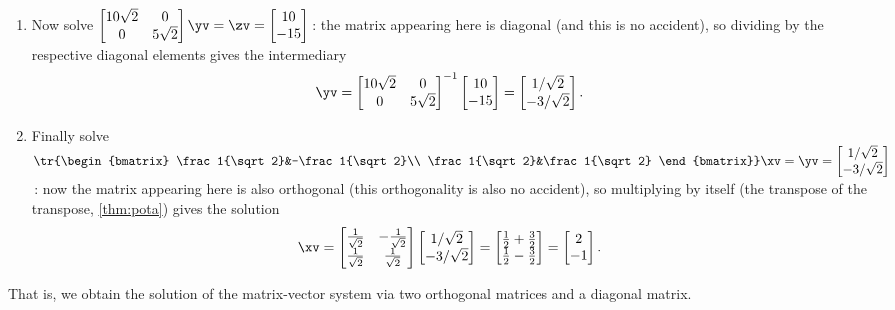 \begin{example}
\begin{solution}
\begin{enumerate}
\item Now solve \(\begin{bmatrix} 10\sqrt2&0\\0&5\sqrt2 \end{bmatrix}\yv=\zv=\begin{bmatrix} 10\\-15 \end{bmatrix}\)\,:  the matrix appearing here is diagonal (and this is no accident), so dividing by the respective diagonal elements gives the intermediary
\begin{equation*}
\yv=\begin{bmatrix} 10\sqrt2&0\\0&5\sqrt2 \end{bmatrix}^{-1}
\begin{bmatrix} 10\\-15 \end{bmatrix}
=\begin{bmatrix} 1/\sqrt2\\-3/\sqrt2 \end{bmatrix}.
\end{equation*}

\item Finally solve \(\tr{\begin{bmatrix} \frac1{\sqrt2}&-\frac1{\sqrt2}\\ \frac1{\sqrt2}&\frac1{\sqrt2} \end{bmatrix}}\xv=\yv=\begin{bmatrix} 1/\sqrt2\\-3/\sqrt2 \end{bmatrix}\)\,: now the matrix appearing here is also orthogonal (this orthogonality is also no accident), so multiplying by itself (the transpose of the transpose, \autoref{thm:pota}) gives the solution
\begin{equation*}
\xv=\begin{bmatrix} \frac1{\sqrt2}&-\frac1{\sqrt2}\\ \frac1{\sqrt2}&\frac1{\sqrt2} \end{bmatrix}
\begin{bmatrix} 1/\sqrt2\\-3/\sqrt2 \end{bmatrix}
=\begin{bmatrix} \frac12+\frac32\\\frac12-\frac32 \end{bmatrix}
=\begin{bmatrix} 2\\-1 \end{bmatrix}.
\end{equation*}

\end{enumerate}
That is, we obtain the solution of the matrix-vector system via two orthogonal matrices and a diagonal matrix.
\end{solution}
\end{example}





